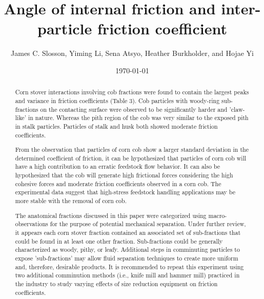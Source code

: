 \documentclass[xcolor=dvipsnames,10pt,hidelinks]{article}
\author{James C. Slosson, Yiming Li, Sena Atsyo, Heather Burkholder, and Hojae Yi}
\date{\today}
\title{Angle of internal friction and inter-particle friction coefficient}
\begin{document}
\maketitle
\begin{abstract}
Corn stover interactions involving cob fractions were found to contain the largest peaks and variance in friction coefficients (Table 3).
Cob particles with woody-ring sub-fractions on the contacting surface were observed to be significantly harder and 'claw-like' in nature.
Whereas the pith region of the cob was very similar to the exposed pith in stalk particles. Particles of stalk and husk both showed moderate friction coefficients.

From the observation that particles of corn cob show a larger standard deviation in the determined coefficient of friction, it can be hypothesized that particles of corn cob will have a high contribution to an erratic feedstock flow behavior.
It can also be hypothesized that the cob will generate high frictional forces considering the high cohesive forces and moderate friction coefficients observed in a corn cob.
The experimental data suggest that high-stress feedstock handling applications may be more stable with the removal of corn cob.

The anatomical fractions discussed in this paper were categorized using macro-observations for the purpose of potential mechanical separation.
Under further review, it appears each corn stover fraction contained an associated set of sub-fractions that could be found in at least one other fraction.
Sub-fractions could be generally characterized as woody, pithy, or leafy.
Additional steps in comminuting particles to expose 'sub-fractions' may allow fluid separation techniques to create more uniform and, therefore, desirable products.
It is recommended to repeat this experiment using two additional comminution methods (i.e., knife mill and hammer mill) practiced in the industry to study varying effects of size reduction equipment on friction coefficients.
\end{abstract}
\end{document}
